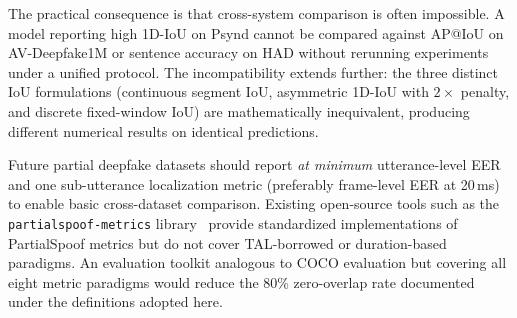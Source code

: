 The practical consequence is that cross-system comparison is often impossible. A model reporting high 1D-IoU on Psynd cannot be compared against AP@IoU on AV-Deepfake1M or sentence accuracy on HAD without rerunning experiments under a unified protocol. The incompatibility extends further: the three distinct IoU formulations (continuous segment IoU, asymmetric 1D-IoU with $2\times$ penalty, and discrete fixed-window IoU) are mathematically inequivalent, producing different numerical results on identical predictions.

Future partial deepfake datasets should report \emph{at minimum} utterance-level EER and one sub-utterance localization metric (preferably frame-level EER at 20\,ms) to enable basic cross-dataset comparison. Existing open-source tools such as the \texttt{partialspoof-metrics} library~\cite{hieuthi_partialspoof_metrics} provide standardized implementations of PartialSpoof metrics but do not cover TAL-borrowed or duration-based paradigms. An evaluation toolkit analogous to COCO evaluation but covering all eight metric paradigms would reduce the 80\% zero-overlap rate documented under the definitions adopted here.

